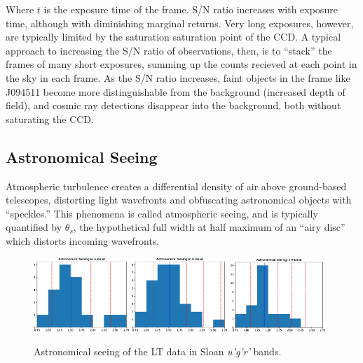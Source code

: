 \documentclass[a4paper,11pt]{article}
\begin{document}
Where $t$ is the exposure time of the frame. S/N ratio increases with exposure time, although with diminishing marginal returns. Very long exposures, however, are typically limited by the saturation saturation point of the CCD. A typical approach to increasing the S/N ratio of observations, then, is to ``stack'' the frames of many short exposures, summing up the counts recieved at each point in the sky in each frame.\cite{mcclure_2019} As the S/N ratio increases, faint objects in the frame like J094511 become more distinguishable from the background (increased depth of field), and cosmic ray detections disappear into the background, both without saturating the CCD.

\subsection{Astronomical Seeing}\label{sec:astronomical_seeing}

Atmospheric turbulence creates a differential density of air above ground-based telescopes, distorting light wavefronts and obfuscating astronomical objects with ``speckles.'' This phenomena is called atmospheric seeing, and is typically quantified by $\theta_s$, the hypothetical full width at half maximum of an ``airy disc'' which distorts incoming wavefronts.

\begin{figure}[h!]
    \includegraphics[width=0.32\textwidth]{seeing_hist_U_band.eps}
    \includegraphics[width=0.32\textwidth]{seeing_hist_G_band.eps}
    \includegraphics[width=0.32\textwidth]{seeing_hist_R_band.eps}
    \caption{Astronomical seeing of the LT data in Sloan \textit{u'g'r'} bands.}
    \label{fig:seeing}
\end{figure}
\end{document}
